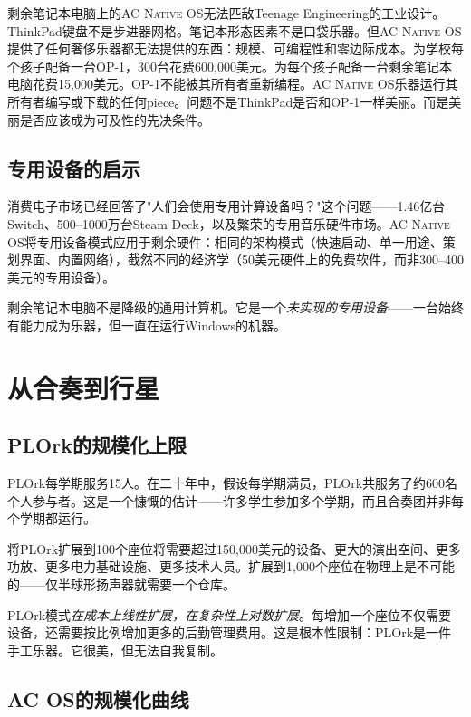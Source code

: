 \documentclass[10pt,letterpaper,twocolumn]{article}
\newcommand{\acos}{\textsc{AC Native OS}}
\begin{document}
剩余笔记本电脑上的\acos{}无法匹敌Teenage Engineering的工业设计。ThinkPad键盘不是步进器网格。笔记本形态因素不是口袋乐器。但\acos{}提供了任何奢侈乐器都无法提供的东西：规模、可编程性和零边际成本。为学校每个孩子配备一台OP-1，300台花费600,000美元。为每个孩子配备一台剩余笔记本电脑花费15,000美元。OP-1不能被其所有者重新编程。\acos{}乐器运行其所有者编写或下载的任何piece。问题不是ThinkPad是否和OP-1一样美丽。而是美丽是否应该成为可及性的先决条件。

\subsection{专用设备的启示}

消费电子市场已经回答了"人们会使用专用计算设备吗？"这个问题——1.46亿台Switch、500--1000万台Steam Deck，以及繁荣的专用音乐硬件市场。\acos{}将专用设备模式应用于剩余硬件：相同的架构模式（快速启动、单一用途、策划界面、内置网络），截然不同的经济学（50美元硬件上的免费软件，而非300--400美元的专用设备）。

剩余笔记本电脑不是降级的通用计算机。它是一个\emph{未实现的专用设备}——一台始终有能力成为乐器，但一直在运行Windows的机器。


\section{从合奏到行星}
\label{sec:scaling}

\subsection{PLOrk的规模化上限}

PLOrk每学期服务15人。在二十年中，假设每学期满员，PLOrk共服务了约600名个人参与者。这是一个慷慨的估计——许多学生参加多个学期，而且合奏团并非每个学期都运行。

将PLOrk扩展到100个座位将需要超过150,000美元的设备、更大的演出空间、更多功放、更多电力基础设施、更多技术人员。扩展到1,000个座位在物理上是不可能的——仅半球形扬声器就需要一个仓库。

PLOrk模式\emph{在成本上线性扩展，在复杂性上对数扩展}。每增加一个座位不仅需要设备，还需要按比例增加更多的后勤管理费用。这是根本性限制：PLOrk是一件手工乐器。它很美，但无法自我复制。

\subsection{AC OS的规模化曲线}
\end{document}
